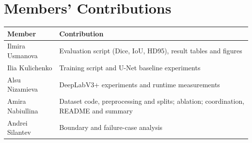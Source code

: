 \documentclass[11pt,a4paper]{article}
\begin{document}
\section{Members' Contributions}
\begin{center}
\small
\begin{tabular}{@{}ll@{}}
\toprule
\textbf{Member} & \textbf{Contribution} \\
\midrule
Ilmira Usmanova  & Evaluation script (Dice, IoU, HD95), result tables and figures \\
Ilia Kulichenko  & Training script and U-Net baseline experiments \\
Alsu Nizamieva   & DeepLabV3+ experiments and runtime measurements \\
Amira Nabiullina & Dataset code, preprocessing and splits; ablation; coordination, README and summary \\
Andrei Silantev  & Boundary and failure-case analysis \\
\bottomrule
\end{tabular}
\end{center}
\end{document}
